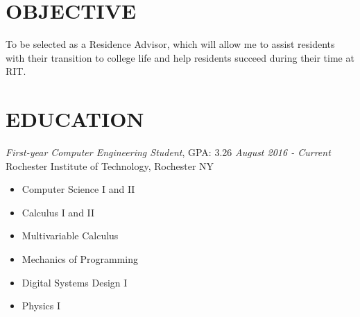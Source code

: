 \documentclass[line,margin]{res}
\begin{document}
\setlength\columnsep{-30pt}
\address{blank}
\address{blank}
\website{}
 
\begin{resume}
 \setlength
 \multicolsep{2pt}

\section{OBJECTIVE} %
	To be selected as a Residence Advisor, which will allow me to assist residents with their transition to college life and help residents succeed during their time at RIT.

\section{EDUCATION} 
	{\sl First-year Computer Engineering Student}, GPA: 3.26 \hfill {\sl August 2016 - Current}\\
                Rochester Institute of Technology, Rochester NY
				\begin{multicols}{2}
					\begin{itemize}
						\itemsep -2pt
						\item[] Computer Science I and II
						\item[] Calculus I and II
						\item[] Multivariable Calculus						
					\end{itemize}
					\begin{itemize}
						\itemsep -2pt
						\item[] Mechanics of Programming
						
						\item[] Digital Systems Design I
						\item[] Physics I
					\end{itemize}
				\end{multicols}
 	

\end{resume}
\end{document}
